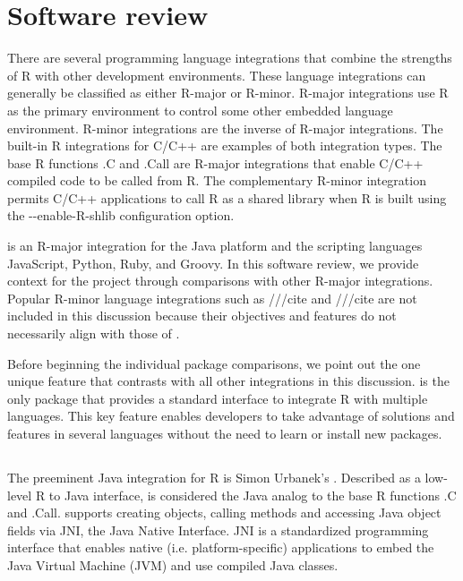 \hypertarget{softwarereview}{\section{Software review}}

There are several programming language integrations that combine the strengths of R with other development environments. These language integrations can generally be classified as either R-major or R-minor. R-major integrations use R as the primary environment to control some other embedded language environment. R-minor integrations are the inverse of R-major integrations. The built-in R integrations for C/C++ are examples of both integration types. The base R functions .C and .Call are R-major integrations that enable C/C++ compiled code to be called from R. The complementary R-minor integration permits C/C++ applications to call R as a shared library when R is built using the -{}-enable-R-shlib configuration option.

 is an R-major integration for the Java platform and the scripting languages JavaScript, Python, Ruby, and Groovy. In this software review, we provide context for the  project through comparisons with other R-major integrations. Popular R-minor language integrations such as  ///cite and  ///cite are not included in this discussion because their objectives and features do not necessarily align with those of .

Before beginning the individual package comparisons, we point out the one unique feature that contrasts  with all other integrations in this discussion.  is the only package that provides a standard interface to integrate R with multiple languages. This key feature enables developers to take advantage of solutions and features in several languages without the need to learn or install new packages.

\subsection{}

The preeminent Java integration for R is Simon Urbanek's . Described as a low-level R to Java interface,  is considered the Java analog to the base R functions .C and .Call.  supports creating objects, calling methods and accessing Java object fields via JNI, the Java Native Interface. JNI is a standardized programming interface that enables native (i.e. platform-specific) applications to embed the Java Virtual Machine (JVM) and use compiled Java classes.

